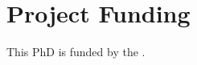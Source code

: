 \documentclass[openright,12pt]{Latex/Classes/PhDthesisPSnPDF}
\begin{document}
\section*{Project Funding}


This PhD is funded by the .


















\end{document}
